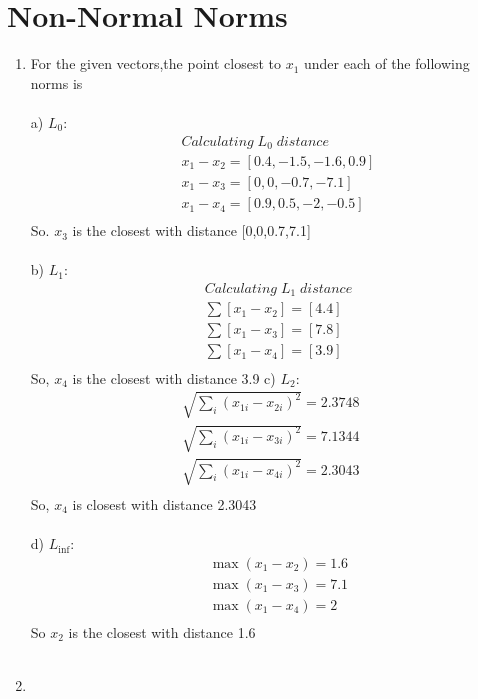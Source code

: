 \documentclass[english]{article}
\begin{document}
\section{Non-Normal Norms}

\begin{enumerate}
\item

For the given vectors,the point closest to $x_1$ under each of the following norms is \\\\
a) $L_0$: 
\begin{align*}
&\;Calculating \; L_0 \;distance \\
&\; x_1 - x_2 = [0.4,-1.5,-1.6,0.9] \\
&\; x_1 - x_3 = [0,0,-0.7,-7.1] \\
&\; x_1 - x_4 = [0.9,0.5,-2,-0.5]\\
\end{align*}
So. $x_3$ is the closest with distance [0,0,0.7,7.1] \\\\
b) $L_1$: 
\begin{align*}
&\; Calculating \; L_1 \;distance \\
&\; \sum [x_1 - x_2] = [4.4] \\
&\; \sum [x_1 - x_3] = [7.8] \\
&\; \sum [x_1 - x_4] = [3.9] \\
\end{align*}
So, $x_4$ is the closest with distance 3.9
c) $L_2$: 
\begin{align*}
\sqrt {\sum_i (x_{1i} - x_{2i})^2 } = 2.3748 \\
\sqrt {\sum_i (x_{1i} - x_{3i})^2 } = 7.1344 \\
\sqrt {\sum_i (x_{1i} - x_{4i})^2 } = 2.3043 \\
\end{align*}
So, $x_4$ is closest with distance 2.3043 \\\\
d) $L_{\inf}$: 
\begin{align*}
&\; \max (x_1 - x_2) = 1.6 \\
&\; \max (x_1 - x_3) = 7.1 \\
&\; \max (x_1 - x_4) = 2 \\
\end{align*}
So $x_2$ is the closest with distance 1.6 \\\\
\item 


\end{enumerate}
\end{document}
